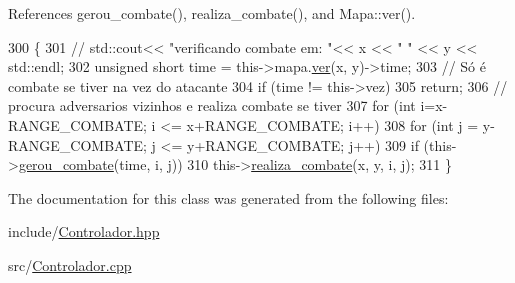 References gerou\+\_\+combate(), realiza\+\_\+combate(), and Mapa\+::ver().


\begin{DoxyCode}
300                                                                      \{
301     \textcolor{comment}{// std::cout<<  "verificando combate em: "<< x << " " << y << std::endl;}
302     \textcolor{keywordtype}{unsigned} \textcolor{keywordtype}{short} time = this->mapa.\mbox{\hyperlink{class_mapa_a52dbdf40a47afb56b1cb35dd1cb552f5}{ver}}(x, y)->time;
303     \textcolor{comment}{// Só é combate se tiver na vez do atacante}
304     \textcolor{keywordflow}{if} (time != this->vez)
305         \textcolor{keywordflow}{return};
306     \textcolor{comment}{// procura adversarios vizinhos e realiza combate se tiver}
307     \textcolor{keywordflow}{for} (\textcolor{keywordtype}{int} i=x-RANGE\_COMBATE; i <= x+RANGE\_COMBATE; i++)
308         \textcolor{keywordflow}{for} (\textcolor{keywordtype}{int} j = y-RANGE\_COMBATE; j <= y+RANGE\_COMBATE; j++)
309             \textcolor{keywordflow}{if} (this->\mbox{\hyperlink{class_controlador_a331d668f08fc4946d79d3742978ef481}{gerou\_combate}}(time, i, j))
310                 this->\mbox{\hyperlink{class_controlador_a3f130df13f0c24605a3e34c3edbd2959}{realiza\_combate}}(x, y, i, j);
311 \}
\end{DoxyCode}


The documentation for this class was generated from the following files\+:\begin{DoxyCompactItemize}
\item 
include/\mbox{\hyperlink{_controlador_8hpp}{Controlador.\+hpp}}\item 
src/\mbox{\hyperlink{_controlador_8cpp}{Controlador.\+cpp}}\end{DoxyCompactItemize}
